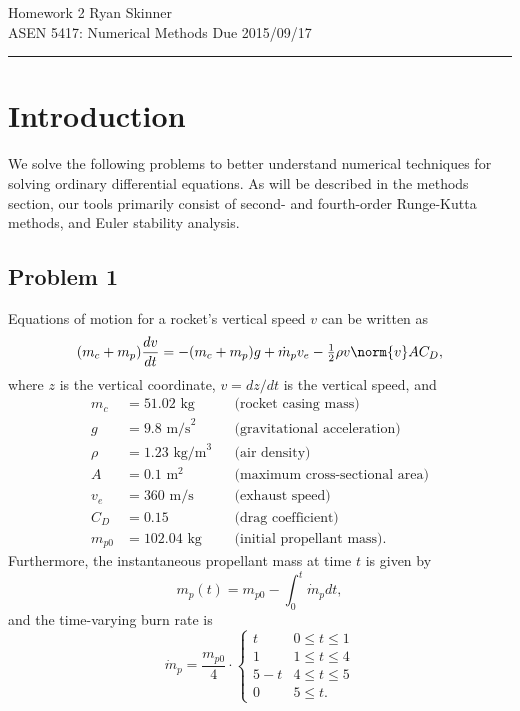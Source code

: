 \documentclass[12pt]{article}
\begin{document}
\pagestyle{fancyplain}
\lhead{}
\chead{}
\rhead{}
\cfoot{\thepage}

\noindent
{\Large Homework 2}
\hfill
{\large Ryan Skinner}
\\[0.5ex]
{\large ASEN 5417: Numerical Methods}
\hfill
{\large Due 2015/09/17}\\
\hrule
\vspace{6pt}

\section{Introduction}

We solve the following problems to better understand numerical techniques for solving ordinary differential equations. As will be described in the methods section, our tools primarily consist of second- and fourth-order Runge-Kutta methods, and Euler stability analysis.

\subsection{Problem 1}

Equations of motion for a rocket's vertical speed $v$ can be written as
\begin{equation}
(m_c + m_p) \frac{dv}{dt} = -(m_c + m_p) g + \dot{m}_p v_e - \tfrac{1}{2} \rho v \norm{v} A C_D
,
\label{eq:rocket}
\end{equation}
where $z$ is the vertical coordinate, $v = dz/dt$ is the vertical speed, and
\begin{equation*}
\begin{aligned}
m_c &= 51.02 \text{ kg} &&\text{(rocket casing mass)} \\
g &= 9.8 \text{ m/s}^2 &&\text{(gravitational acceleration)} \\
\rho &= 1.23 \text{ kg/m}^3 &&\text{(air density)} \\
A &= 0.1 \text{ m}^2 &&\text{(maximum cross-sectional area)} \\
v_e &= 360 \text{ m/s} &&\text{(exhaust speed)} \\
C_D &= 0.15 &&\text{(drag coefficient)} \\
m_{p0} &= 102.04 \text{ kg} &&\text{(initial propellant mass)}
.
\end{aligned}
\end{equation*}
Furthermore, the instantaneous propellant mass at time $t$ is given by
\begin{equation}
m_p(t) = m_{p0} - \int_0^t \dot{m}_p dt
,
\end{equation}
and the time-varying burn rate is
\begin{equation}
\dot{m}_p =
\frac{m_{p0}}{4}
\cdot
\begin{cases}
t     & 0 \le t \le 1 \\
1     & 1 \le t \le 4 \\
5 - t & 4 \le t \le 5 \\
0     & 5 \le t
.
\end{cases}
\end{equation}
\end{document}
